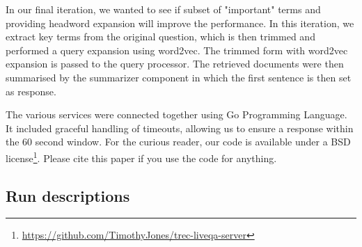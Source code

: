 \documentclass[a4paper,10pt,conference,compsocconf,final]{IEEEtran}
\begin{document}
In our final iteration, we wanted to see if subset of "important" terms and providing headword expansion will improve the performance. In this iteration, we extract key terms from the original question, which is then trimmed and performed a query expansion using word2vec. The trimmed form with word2vec expansion is passed to the query processor. The retrieved documents were then summarised by the summarizer component in which the first sentence is then set as response.

The various services were connected together using Go Programming Language. It included graceful handling of timeouts, allowing us to ensure
a response within the 60 second window. 
For the curious reader, our code is
available under a BSD license\footnote{\url{https://github.com/TimothyJones/trec-liveqa-server}}. Please cite this paper if you use the code for anything.

\subsection{Run descriptions}
\label{sec:runs}
\end{document}
